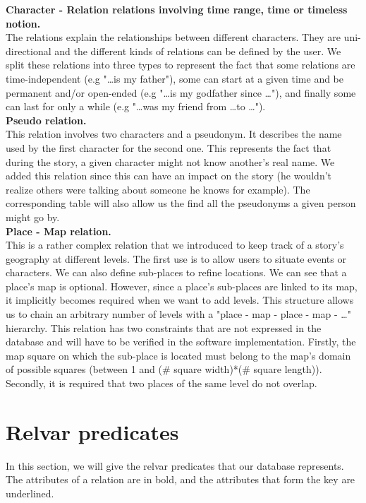 \documentclass[a4paper ,12pt,french]{article}
\begin{document}
\textbf{Character - Relation relations involving time range, time or timeless notion.} \\
The relations explain the relationships between different characters. They are uni-directional and the different kinds of relations can be defined by the user.
We split these relations into three types to represent the fact that some relations are time-independent (e.g "\dots is my father"), some can start at a given time and be permanent and/or open-ended (e.g "\dots is my godfather since \dots"), and finally some can last for only a while (e.g "\dots was my friend from \dots to \dots").\\

\textbf{Pseudo relation.} \\
This relation involves two characters and a pseudonym. It describes the name used by the first character for the second one. This represents the fact that during the story, a given character might not know another's real name. We added this relation since this can have an impact on the story (he wouldn't realize others were talking about someone he knows for example).
The corresponding table will also allow us the find all the pseudonyms a given person might go by.\\

\textbf{Place - Map relation.} \\
This is a rather complex relation that we introduced to keep track of a story's geography at different levels. The first use is to allow users to situate events or characters. We can also define sub-places to refine locations. 
We can see that a place's map is optional. However, since a place's sub-places are linked to its map, it implicitly  becomes required when we want to add levels. This structure allows us to chain an arbitrary number of levels with a "place - map - place - map - \dots" hierarchy.
This relation has two constraints that are not expressed in the database and will have to be verified in the software implementation. Firstly, the map square on which the sub-place is located must belong to the map's domain of possible squares (between 1 and (\# square width)*(\# square length)). Secondly, it is required that two places of the same level do not overlap.

\section{Relvar predicates}
In this section, we will give the relvar predicates that our database represents. The attributes of a relation are in bold, and the attributes that form the key are underlined.
\end{document}
